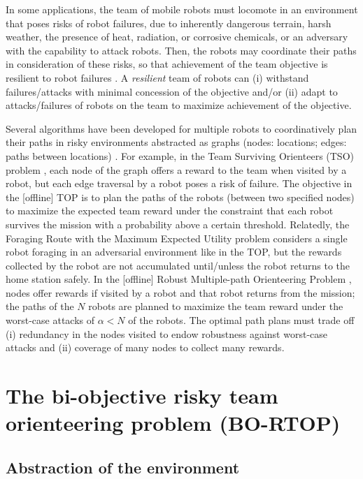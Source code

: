 \documentclass[11pt, oneside]{article}
\begin{document}
In some applications, the team of mobile robots must locomote in an environment that poses risks of robot failures, due to inherently dangerous terrain, harsh weather, the presence of heat, radiation, or corrosive chemicals, or an adversary with the capability to attack robots. Then, the robots may coordinate their paths in consideration of these risks, so that achievement of the team objective is resilient to robot failures \cite{zhou2021multi}. A \emph{resilient} team of robots can (i) withstand failures/attacks with minimal concession of the objective and/or (ii) adapt to attacks/failures of robots on the team to maximize achievement of the objective. 

Several algorithms have been developed for multiple robots to coordinatively plan their paths in risky environments abstracted as graphs (nodes: locations; edges: paths between locations) \cite{jorgensen2018team,shi2023robust,zhou2022distributed}. 
For example, in the Team Surviving Orienteers (TSO) problem \cite{jorgensen2018team}, each node of the graph offers a reward to the team when visited by a robot, but each edge traversal by a robot poses a risk of failure. The objective in the [offline] TOP is to plan the paths of the robots (between two specified nodes) to maximize the expected team reward under the constraint that each robot survives the mission with a probability above a certain threshold. 
Relatedly, the Foraging Route with the Maximum Expected Utility problem \cite{di2022foraging} considers a single robot foraging in an adversarial environment like in the TOP, but the rewards collected by the robot are not accumulated until/unless the robot returns to the home station safely.
In the [offline] Robust Multiple-path Orienteering Problem \cite{shi2023robust}, nodes offer rewards if visited by a robot and that robot returns from the mission; the paths of the $N$ robots are planned to maximize the team reward under the worst-case attacks of $\alpha<N$ of the robots. The optimal path plans must trade off (i) redundancy in the nodes visited to endow robustness against worst-case attacks and (ii) coverage of many nodes to collect many rewards.



\section{The bi-objective risky team orienteering problem (BO-RTOP)}
\subsection{Abstraction of the environment}
\end{document}
